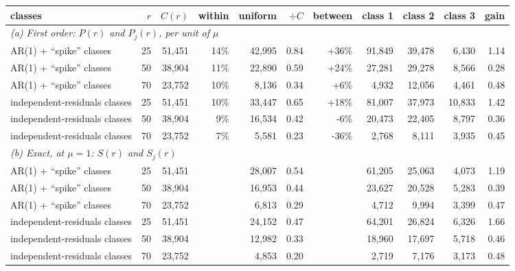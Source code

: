 \begin{tabular}{lrrrrrrrrrr}
\toprule
classes & $r$ & $C(r)$ & within & uniform & $\div C$ & between & class 1 & class 2 & class 3 & gain \\
\midrule
\multicolumn{11}{l}{\textit{(a) First order: $P(r)$ and $P_j(r)$, per unit of $\mu$}} \\
AR(1) + ``spike'' classes & 25 & 51,451 & 14\% & 42,995 & 0.84 & +36\% & 91,849 & 39,478 & 6,430 & 1.14 \\
AR(1) + ``spike'' classes & 50 & 38,904 & 11\% & 22,890 & 0.59 & +24\% & 27,281 & 29,278 & 8,566 & 0.28 \\
AR(1) + ``spike'' classes & 70 & 23,752 & 10\% & 8,136 & 0.34 & +6\% & 4,932 & 12,056 & 4,461 & 0.48 \\
independent-residuals classes & 25 & 51,451 & 10\% & 33,447 & 0.65 & +18\% & 81,007 & 37,973 & 10,833 & 1.42 \\
independent-residuals classes & 50 & 38,904 & 9\% & 16,534 & 0.42 & -6\% & 20,473 & 22,405 & 8,797 & 0.36 \\
independent-residuals classes & 70 & 23,752 & 7\% & 5,581 & 0.23 & -36\% & 2,768 & 8,111 & 3,935 & 0.45 \\
\midrule\multicolumn{11}{l}{\textit{(b) Exact, at $\mu=1$: $S(r)$ and $S_j(r)$}} \\
AR(1) + ``spike'' classes & 25 & 51,451 &  & 28,007 & 0.54 &  & 61,205 & 25,063 & 4,073 & 1.19 \\
AR(1) + ``spike'' classes & 50 & 38,904 &  & 16,953 & 0.44 &  & 23,627 & 20,528 & 5,283 & 0.39 \\
AR(1) + ``spike'' classes & 70 & 23,752 &  & 6,813 & 0.29 &  & 4,712 & 9,994 & 3,399 & 0.47 \\
independent-residuals classes & 25 & 51,451 &  & 24,152 & 0.47 &  & 64,201 & 26,824 & 6,326 & 1.66 \\
independent-residuals classes & 50 & 38,904 &  & 12,982 & 0.33 &  & 18,960 & 17,697 & 5,718 & 0.46 \\
independent-residuals classes & 70 & 23,752 &  & 4,853 & 0.20 &  & 2,719 & 7,176 & 3,173 & 0.48 \\
\bottomrule
\end{tabular}
